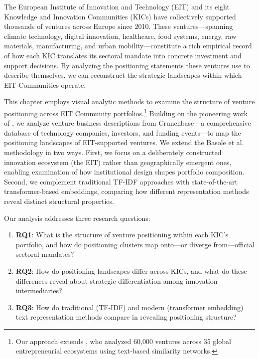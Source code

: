 \documentclass[../main.tex]{subfiles}
\begin{document}
The European Institute of Innovation and Technology (EIT) and its eight Knowledge and Innovation Communities (KICs) have collectively supported thousands of ventures across Europe since 2010. These ventures---spanning climate technology, digital innovation, healthcare, food systems, energy, raw materials, manufacturing, and urban mobility---constitute a rich empirical record of how each KIC translates its sectoral mandate into concrete investment and support decisions. By analyzing the positioning statements these ventures use to describe themselves, we can reconstruct the strategic landscapes within which EIT Communities operate.

This chapter employs visual analytic methods to examine the structure of venture positioning across EIT Community portfolios.\footnote{Our approach extends \cite{basole2019visual}, who analyzed 60,000 ventures across 35 global entrepreneurial ecosystems using text-based similarity networks.} Building on the pioneering work of \cite{basole2019visual}, we analyze venture business descriptions from Crunchbase---a comprehensive database of technology companies, investors, and funding events---to map the positioning landscapes of EIT-supported ventures. We extend the Basole et al. methodology in two ways. First, we focus on a deliberately constructed innovation ecosystem (the EIT) rather than geographically emergent ones, enabling examination of how institutional design shapes portfolio composition. Second, we complement traditional TF-IDF approaches with state-of-the-art transformer-based embeddings, comparing how different representation methods reveal distinct structural properties.

Our analysis addresses three research questions:

\begin{enumerate}
    \item \textbf{RQ1}: What is the structure of venture positioning within each KIC's portfolio, and how do positioning clusters map onto---or diverge from---official sectoral mandates?
    \item \textbf{RQ2}: How do positioning landscapes differ across KICs, and what do these differences reveal about strategic differentiation among innovation intermediaries?
    \item \textbf{RQ3}: How do traditional (TF-IDF) and modern (transformer embedding) text representation methods compare in revealing positioning structure?
\end{enumerate}
\end{document}
